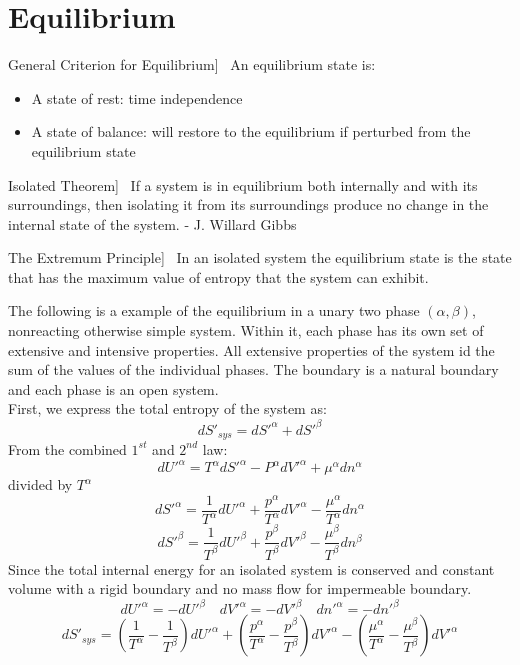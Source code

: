 \documentclass[UTF8]{book}
\newenvironment{theorem}[2][Theorem]{\begin{trivlist}
\item[\hskip \labelsep {\bfseries #1}\hskip \labelsep {\bfseries }]}{\end{trivlist}}
\begin{document}
\section{Equilibrium}
\begin{theorem}
[General Criterion for Equilibrium]~  {An equilibrium state is:}
\begin{itemize}
\item  {A state of rest: time independence}
\item  {A state of balance: will restore to the equilibrium if perturbed from the equilibrium state}
\end{itemize}
\end{theorem}
\begin{theorem}
[Isolated Theorem]~  {If a system is in equilibrium both internally and with its surroundings, then isolating it from its surroundings produce no change in the internal state of the system. - J. Willard Gibbs}
\end{theorem}
\begin{theorem}
[The Extremum Principle]~  {In an isolated system the equilibrium state is the state that has the maximum value of entropy that the system can exhibit.}
\end{theorem}
 {The following is a example of the equilibrium in a unary two phase $(\alpha , \beta)$, nonreacting otherwise simple system. Within it, each phase has its own set of extensive and intensive properties. All extensive properties of the system id the sum of the values of the individual phases. The boundary is a natural boundary and each phase is an open system.}\\
 {First, we express the total entropy of the system as:}
$$dS'_{sys}=dS'^\alpha +dS'^\beta $$
 {From the combined $1^{st}$ and $2^{nd}$ law:}
$$dU'^\alpha =T^\alpha dS'^\alpha -P^\alpha dV'^\alpha +\mu ^\alpha dn^\alpha $$
 {divided by $T^\alpha $}
$$dS'^\alpha =\dfrac{1}{T^\alpha }dU'^\alpha +\dfrac{p^\alpha }{T^\alpha }dV'^\alpha -\dfrac{\mu ^\alpha }{T^\alpha }dn^\alpha $$
$$dS'^\beta  =\dfrac{1}{T^\beta }dU'^\beta +\dfrac{p^\beta }{T^\beta }dV'^\beta -\dfrac{\mu ^\beta }{T^\beta }dn^\beta $$
 {Since the total internal energy for an isolated system is conserved and constant volume with a rigid boundary and no mass flow for impermeable boundary.}
$$dU'^\alpha=-dU'^\beta \quad dV'^\alpha=-dV'^\beta \quad dn'^\alpha=-dn'^\beta $$
$$dS'_{sys}=\left(\dfrac{1}{T^\alpha }-\dfrac{1}{T^\beta }\right)dU'^\alpha+\left(\dfrac{p^\alpha }{T^\alpha }-\dfrac{p^\beta }{T^\beta }\right)dV'^\alpha-\left(\dfrac{\mu ^\alpha }{T^\alpha }-\dfrac{\mu ^\beta }{T^\beta }\right)dV'^\alpha $$
\end{document}
